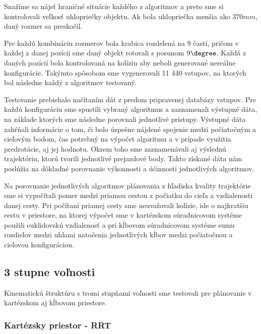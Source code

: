 Snažíme sa nájsť hraničné situácie každého z algoritmov a preto sme si kontrolovali veľkosť uhlopriečky objektu. Ak bola uhlopriečka menšia ako $ 370 mm $, daný rozmer sa preskočil.  

Pre každú kombináciu rozmerov bola krabica rozdelená na 9 častí, pričom v každej z danej pozícii sme daný objekt rotovali s posunom $ 9 \degree $. Každá z daných pozícií bola kontrolovaná na kolíziu aby neboli generované nereálne konfigurácie. Takýmto spôsobom sme vygenerovali  11 440 vstupov, na ktorých bol následne každý z algoritmov testovaný. 

Testovanie prebiehalo načítaním dát z predom pripravenej databázy vstupov. Pre každú konfiguráciu sme spustili vybraný algoritmus a zaznamenali výstupné dáta, na základe ktorých sme následne porovnali jednotlivé prístupy. Výstupné dáta zahŕňali informácie o tom, či bolo úspešne nájdené spojenie medzi počiatočným a cieľovým bodom, čas potrebný na výpočet algoritmu a v prípade využitia predrotácie, aj jej hodnotu. Okrem toho sme zaznamenávali aj výslednú trajektóriu, ktorú tvorili jednotlivé prejazdové body. Takto získané dáta nám poslúžia na dôkladné porovnanie výkonnosti a účinnosti jednotlivých algoritmov.

Na porovnanie jednotlivých algoritmov plánovania z hľadiska kvality trajektórie sme si vypočítali pomer medzi priamou cestou z počiatku do cieľa a vzdialenosti danej cesty. Pri počítaní priamej cesty sme neuvažovali kolízie, ide o najkratšiu cestu v priestore, na ktorej výpočet sme v kartézskom súradnicovom systéme použili euklidovskú vzdialenosť a pri kĺbovom súradnicovom systéme sumu rozdielov medzi uhlami natočenia jednotlivých kĺbov medzi počiatočnou a cieľovou konfiguráciou.  

\subsection{3 stupne voľnosti}
\label{kap:5.1}
Kinematickú štruktúru s tromi stupňami voľnosti sme testovali pre plánovanie v kartézskom aj kĺbovom priestore. 

\subsubsection{Kartézsky priestor - RRT}

